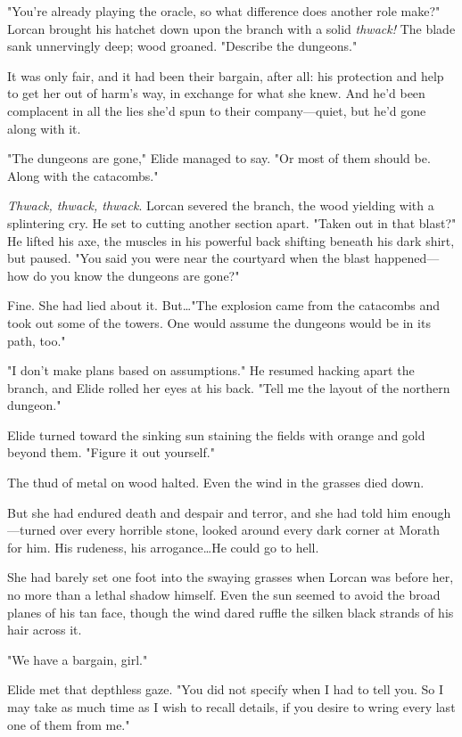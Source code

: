 "You're already playing the oracle, so what difference does another role make?"
Lorcan brought his hatchet down upon the branch with a solid \emph{thwack!} The blade sank unnervingly deep; wood groaned.
"Describe the dungeons."

It was only fair, and it had been their bargain, after all: his protection and help to get her out of harm's way, in exchange for what she knew.
And he'd been complacent in all the lies she'd spun to their company---quiet, but he'd gone along with it.

"The dungeons are gone," Elide managed to say.
"Or most of them should be.
Along with the catacombs."

\emph{Thwack, thwack, thwack}.
Lorcan severed the branch, the wood yielding with a splintering cry.
He set to cutting another section apart.
"Taken out in that blast?"
He lifted his axe, the muscles in his powerful back shifting beneath his dark shirt, but paused.
"You said you were near the courtyard when the blast happened---how do you know the dungeons are gone?"

Fine.
She had lied about it.
But\ldots "The explosion came from the catacombs and took out some of the towers.
One would assume the dungeons would be in its path, too."

"I don't make plans based on assumptions."
He resumed hacking apart the branch, and Elide rolled her eyes at his back.
"Tell me the layout of the northern dungeon."

Elide turned toward the sinking sun staining the fields with orange and gold beyond them.
"Figure it out yourself."

The thud of metal on wood halted.
Even the wind in the grasses died down.

But she had endured death and despair and terror, and she had told him enough---turned over every horrible stone, looked around every dark corner at Morath for him.
His rudeness, his arrogance\ldots He could go to hell.

She had barely set one foot into the swaying grasses when Lorcan was before her, no more than a lethal shadow himself.
Even the sun seemed to avoid the broad planes of his tan face, though the wind dared ruffle the silken black strands of his hair across it.

"We have a bargain, girl."

Elide met that depthless gaze.
"You did not specify when I had to tell you.
So I may take as much time as I wish to recall details, if you desire to wring every last one of them from me."


